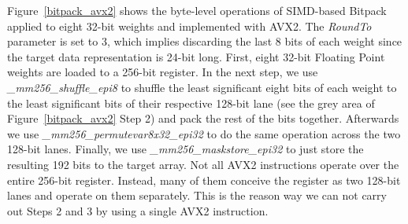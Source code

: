 Figure~\ref{bitpack_avx2} shows the byte-level operations of SIMD-based Bitpack applied to eight 32-bit weights and implemented with AVX2. 
The \textit{RoundTo} parameter is set to 3, which implies discarding the last 8 bits of 
each weight since the target data representation is 24-bit long. 
First, eight 32-bit Floating Point weights are loaded to a 256-bit register.
In the next step, we use \textit{\_mm256\_shuffle\_epi8} to shuffle the least significant
eight bits of each weight to the least significant bits of their respective 128-bit lane 
(see the grey area of Figure~\ref{bitpack_avx2} Step 2) and pack the rest of the bits 
together. 
Afterwards we use \textit{\_mm256\_permutevar8x32\_epi32} to do the same operation 
across the two 128-bit lanes. 
Finally, we use \textit{\_mm256\_maskstore\_epi32} to just store  
the resulting 192 bits to the target array.
Not all AVX2 instructions operate over the entire 256-bit register.
Instead, many of
them conceive the register as two 128-bit lanes and operate on them separately.
This is the reason way we can not carry out Steps 2 and 3 by using a single AVX2 instruction.


